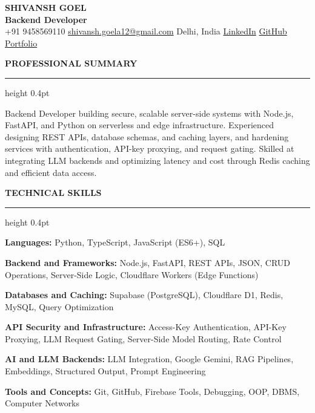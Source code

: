 \documentclass[10pt,a4paper]{article}
\newcommand{\resumeSection}[1]{%
  \vspace{5pt}
  {\normalsize\bfseries\color{heading} #1}\par
  \vspace{1pt}
  {\color{rulecolor}\hrule height 0.4pt}
  \vspace{3pt}
}
\newcommand{\skillLine}[2]{%
  \textbf{#1:} #2\par
}
\begin{document}
\begin{center}
    {\fontsize{21}{23}\selectfont\bfseries\color{heading}
    SHIVANSH GOEL}\\[2pt]
    {\normalsize\bfseries Backend Developer}\\[4pt]

    {\small
    +91 9458569110
    \quad \textbar{} \quad
    \href{mailto:shivansh.goela12@gmail.com}
    {shivansh.goela12@gmail.com}
    \quad \textbar{} \quad
    Delhi, India
    \quad \textbar{} \quad
    \href{https://www.linkedin.com/in/shivansh-goel-5b2309174}
    {LinkedIn}
    \quad \textbar{} \quad
    \href{https://github.com/Tech-aficionado}
    {GitHub}
    \quad \textbar{} \quad
    \href{https://0xshiv.dev}
    {Portfolio}
    }
\end{center}

\vspace{-4pt}

\resumeSection{PROFESSIONAL SUMMARY}

Backend Developer building secure, scalable server-side systems with Node.js,
FastAPI, and Python on serverless and edge infrastructure. Experienced
designing REST APIs, database schemas, and caching layers, and hardening
services with authentication, API-key proxying, and request gating.
Skilled at integrating LLM backends and optimizing latency and cost through
Redis caching and efficient data access.

\resumeSection{TECHNICAL SKILLS}

\small

\skillLine{Languages}
{Python, TypeScript, JavaScript (ES6+), SQL}

\skillLine{Backend and Frameworks}
{Node.js, FastAPI, REST APIs, JSON, CRUD Operations, Server-Side Logic,
Cloudflare Workers (Edge Functions)}

\skillLine{Databases and Caching}
{Supabase (PostgreSQL), Cloudflare D1, Redis, MySQL, Query Optimization}

\skillLine{API Security and Infrastructure}
{Access-Key Authentication, API-Key Proxying, LLM Request Gating,
Server-Side Model Routing, Rate Control}

\skillLine{AI and LLM Backends}
{LLM Integration, Google Gemini, RAG Pipelines, Embeddings,
Structured Output, Prompt Engineering}

\skillLine{Tools and Concepts}
{Git, GitHub, Firebase Tools, Debugging, OOP, DBMS, Computer Networks}
\end{document}
